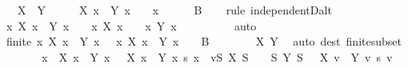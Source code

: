 \begin{isabellebody}
\ \ \ {\isachardoublequoteopen}X\ {\isacharequal}{\kern0pt}\ Y{\isachardoublequoteclose}\isanewline
%
\isadelimproof
%
\endisadelimproof
%
\isatagproof
{}\isamarkupfalse%
\ {\isacharminus}{\kern0pt}\isanewline
\ \ \isamarkupfalse%
\ {\isachardoublequoteopen}X\ x\ {\isacharminus}{\kern0pt}\ Y\ x\ {\isacharequal}{\kern0pt}\ {}{\isachardoublequoteclose}\ \ x\isanewline
\ \ \ \ \isamarkupfalse%
\ B\isanewline
\ \ \isamarkupfalse%
\ {\isacharparenleft}{\kern0pt}rule\ independentD{\isacharunderscore}{\kern0pt}alt{\isacharparenright}{\kern0pt}\isanewline
\ \ \ \ \isamarkupfalse%
\ {\isachardoublequoteopen}{\isacharbraceleft}{\kern0pt}x{\isachardot}{\kern0pt}\ X\ x\ {\isacharminus}{\kern0pt}\ Y\ x\ {\isasymnoteq}\ {}{\isacharbraceright}{\kern0pt}\ {\isasymsubseteq}\ {\isacharbraceleft}{\kern0pt}x{\isachardot}{\kern0pt}\ X\ x\ {\isasymnoteq}\ {}{\isacharbraceright}{\kern0pt}\ {\isasymunion}\ {\isacharbraceleft}{\kern0pt}x{\isachardot}{\kern0pt}\ Y\ x\ {\isasymnoteq}\ {}{\isacharbraceright}{\kern0pt}{\isachardoublequoteclose}\isanewline
\ \ \ \ \ \ \isamarkupfalse%
\ auto\isanewline
\ \ \ \ \isamarkupfalse%
\ \isamarkupfalse%
\ {\isachardoublequoteopen}finite\ {\isacharbraceleft}{\kern0pt}x{\isachardot}{\kern0pt}\ X\ x\ {\isacharminus}{\kern0pt}\ Y\ x\ {\isasymnoteq}\ {}{\isacharbraceright}{\kern0pt}{\isachardoublequoteclose}\ {\isachardoublequoteopen}{\isacharbraceleft}{\kern0pt}x{\isachardot}{\kern0pt}\ X\ x\ {\isacharminus}{\kern0pt}\ Y\ x\ {\isasymnoteq}\ {}{\isacharbraceright}{\kern0pt}\ {\isasymsubseteq}\ B{\isachardoublequoteclose}\isanewline
\ \ \ \ \ \ \isamarkupfalse%
\ X\ Y\ \isamarkupfalse%
\ {\isacharparenleft}{\kern0pt}auto\ dest{\isacharcolon}{\kern0pt}\ finite{\isacharunderscore}{\kern0pt}subset{\isacharparenright}{\kern0pt}\isanewline
\ \ \ \ \isamarkupfalse%
\ \isamarkupfalse%
\ {\isachardoublequoteopen}{\isacharparenleft}{\kern0pt}{\isasymSum}x\ {\isacharbar}{\kern0pt}\ X\ x\ {\isacharminus}{\kern0pt}\ Y\ x\ {\isasymnoteq}\ {}{\isachardot}{\kern0pt}\ {\isacharparenleft}{\kern0pt}X\ x\ {\isacharminus}{\kern0pt}\ Y\ x{\isacharparenright}{\kern0pt}\ {\isacharasterisk}{\kern0pt}s\ x{\isacharparenright}{\kern0pt}\ {\isacharequal}{\kern0pt}\ {\isacharparenleft}{\kern0pt}{\isasymSum}v{\isasymin}{\isacharbraceleft}{\kern0pt}S{\isachardot}{\kern0pt}\ X\ S\ {\isasymnoteq}\ {}{\isacharbraceright}{\kern0pt}\ {\isasymunion}\ {\isacharbraceleft}{\kern0pt}S{\isachardot}{\kern0pt}\ Y\ S\ {\isasymnoteq}\ {}{\isacharbraceright}{\kern0pt}{\isachardot}{\kern0pt}\ {\isacharparenleft}{\kern0pt}X\ v\ {\isacharminus}{\kern0pt}\ Y\ v{\isacharparenright}{\kern0pt}\ {\isacharasterisk}{\kern0pt}s\ v{\isacharparenright}{\kern0pt}{\isachardoublequoteclose}\isanewline

\end{isabellebody}
